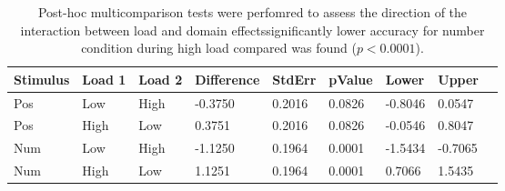 \begin{table}
\centering
\begin{tabular}[0.2em]{@{}lllllllll@{}}\toprule
Stimulus & Load 1 & Load 2 & Difference & StdErr & pValue & Lower & Upper\\\toprule[0.2em]
Pos & Low & High & -0.3750 & 0.2016 & 0.0826 & -0.8046 & 0.0547 \\\midrule
Pos & High & Low & 0.3751 & 0.2016 & 0.0826 & -0.0546 & 0.8047 \\\midrule
Num & Low & High & -1.1250 & 0.1964 & 0.0001 & -1.5434 & -0.7065 \\\midrule
Num & High & Low & 1.1251 & 0.1964 & 0.0001 & 0.7066 & 1.5435 \\\bottomrule[0.2em]
\end{tabular}
\caption{Post-hoc multicomparison tests were perfomred to assess the direction of the interaction between load and domain effectssignificantly lower accuracy for number condition during high load compared was found ($p<0.0001$).\label{tabel:rmANOVA_acc_ph_inter_study2}}
\end{table}
